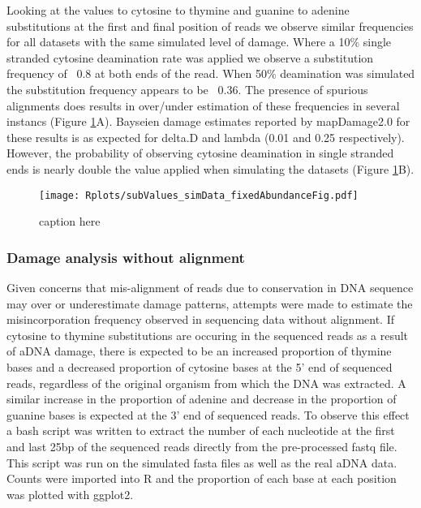 \documentclass[12pt, a4paper]{article}
\begin{document}
Looking at the values to cytosine to thymine and guanine to adenine substitutions at the first and final position of reads we observe similar frequencies for all datasets with the same simulated level of damage. 
Where a 10\% single stranded cytosine deamination rate was applied we observe a substitution frequency of ~0.8 at both ends of the read.
When 50\% deamination was simulated the substitution frequency appears to be ~0.36.
The presence of spurious alignments does results in over/under estimation of these frequencies in several instancs (Figure \ref{fig:subValues_simDataFig}A).
Bayseien damage estimates reported by mapDamage2.0 for these results is as expected for delta.D and lambda (0.01 and 0.25 respectively). However, the probability of observing cytosine deamination in single stranded ends is nearly double the value applied when simulating the datasets (Figure \ref{fig:subValues_simDataFig}B).

\begin{figure}[ht!]
	\centering
	\texttt{[image: Rplots/subValues\_simData\_fixedAbundanceFig.pdf]}
	\small\caption{caption here}\label{fig:subValues_simDataFig}
\end{figure}
\clearpage

\subsubsection{Damage analysis without alignment}

Given concerns that mis-alignment of reads due to conservation in DNA sequence may over or underestimate damage patterns, attempts were made to estimate the misincorporation frequency observed in sequencing data without alignment. 
If cytosine to thymine substitutions are occuring in the sequenced reads as a result of aDNA damage, there is expected to be an increased proportion of thymine bases and a decreased proportion of cytosine bases at the 5' end of sequenced reads, regardless of the original organism from which the DNA was extracted. 
A similar increase in the proportion of adenine and decrease in the proportion of guanine bases is expected at the 3' end of sequenced reads. 
To observe this effect a bash script was written to extract the number of each nucleotide at the first and last 25bp of the sequenced reads directly from the pre-processed fastq file. 
This script was run on the simulated fasta files as well as the real aDNA data.
Counts were imported into R and the proportion of each base at each position was plotted with ggplot2. 
\end{document}
